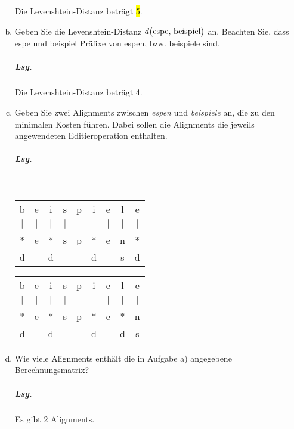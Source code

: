\documentclass{scrreprt}
\begin{document}
\begin{enumerate}[a)]
  Die Levenshtein-Distanz beträgt \colorbox{yellow}{5}.

\item Geben Sie die Levenshtein-Distanz $d\qty\big(\text{espe, beispiel})$ an.
  Beachten Sie, dass espe und beispiel Präfixe von espen, bzw. beispiele sind.

  \subparagraph{Lsg.} Die Levenshtein-Distanz beträgt \colorbox{green!30}{4}.

\newpage
\item Geben Sie zwei Alignments zwischen \emph{espen} und \emph{beispiele} an,
  die zu den minimalen Kosten führen.
  Dabei sollen die Alignments die jeweils angewendeten Editieroperation enthalten.

  \subparagraph{Lsg.} \:\\
  \begin{tabular}{ccccccccc}
    b & e & i & s & p & i & e & l & e\\
    $\mid$ & $\mid$ & $\mid$ & $\mid$ & $\mid$ & $\mid$ & $\mid$ & $\mid$ & $\mid$ \\
    * & e & * & s & p & * & e & n & *\\
    d &   & d &   &   & d &   & s & d
  \end{tabular}

  \begin{tabular}{ccccccccc}
    b & e & i & s & p & i & e & l & e\\
    $\mid$ & $\mid$ & $\mid$ & $\mid$ & $\mid$ & $\mid$ & $\mid$ & $\mid$ & $\mid$ \\
    * & e & * & s & p & * & e & * & n\\
    d &   & d &   &   & d &   & d & s
  \end{tabular}

\item Wie viele Alignments enthält die in Aufgabe a) angegebene Berechnungsmatrix?

  \subparagraph{Lsg.} Es gibt 2 Alignments.
\end{enumerate}
\end{document}
